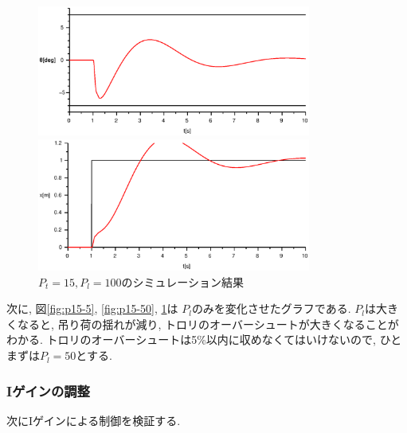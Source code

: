 \documentclass[titlepage]{jsarticle}
\begin{document}
            \begin{figure}[h]
                \begin{minipage}{0.5\hsize}
                    \centering
                    \includegraphics[width=9cm]{img/P15-100t.eps}
                \end{minipage}
                \begin{minipage}{0.5\hsize}
                    \centering
                    \includegraphics[width=9cm]{img/P15-100x.eps}
                \end{minipage}
                \caption{$P_t = 15, P_l = 100$のシミュレーション結果}
                \label{fig:p15-100}
            \end{figure}

            次に, 図\ref{fig:p15-5}, \ref{fig:p15-50}, \ref{fig:p15-100}は
            $P_l$のみを変化させたグラフである.
            $P_l$は大きくなると, 吊り荷の揺れが減り,
            トロリのオーバーシュートが大きくなることがわかる.
            トロリのオーバーシュートは5\%以内に収めなくてはいけないので,
            ひとまずは$P_l = 50$とする.

        \subsubsection{Iゲインの調整}
            次にIゲインによる制御を検証する.
\end{document}
